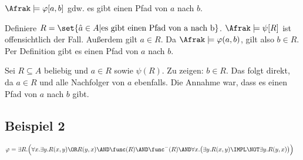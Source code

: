 \begin{description}[style=nextline]
  \item[Behauptung:] $\Afrak\models\varphi[a,b]$ gdw. es gibt einen Pfad von $a$ nach $b$.
  
  \item[\enquote{$\Rightarrow$}]
  Definiere $R=\set{\hat{a}\in A| \text{es gibt einen Pfad von a nach b}}$.
  $\Afrak\models\psi[R]$ ist offensichtlich der Fall. Außerdem gilt $a\in R$.
  Da $\Afrak\models\varphi(a,b)$, gilt also $b\in R$. Per Definition gibt
  es einen Pfad von $a$ nach $b$.
  
  \item[\enquote{$\Leftarrow$}]
  Sei $R\subseteq A$ beliebig und $a\in R$ sowie $\psi(R)$. Zu zeigen: $b\in R$.
  Das folgt direkt, da $a\in R$ und alle Nachfolger von $a$ ebenfalls.
  Die Annahme war, dass es einen Pfad von $a$ nach $b$ gibt.
\end{description}

\subsection{Beispiel 2}

\begin{align*}
  \varphi &= \exists R.\Bigl(
    \forall x.\exists y.R(x,y) \OR R(y,x)
    \AND \func(R)
    \AND \func^-(R)
    \AND \forall x.\bigl(\exists y.R(x,y) \IMPL \NOT\exists y.R(y,x)\bigr)
  \Bigr)
\end{align*}
